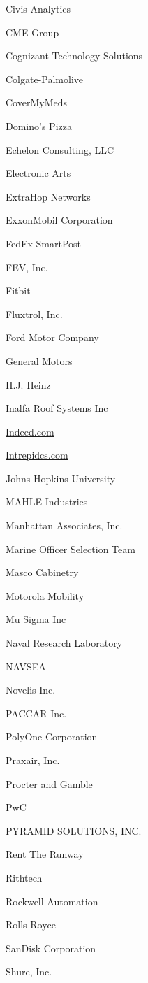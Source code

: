 \documentclass[twoside]{article}
\begin{document}
\begin{center}
\begin{multicols}{5}
\begin{FlushLeft}
\begin{compactitem}
\item Civis Analytics
\item CME Group
\item Cognizant Technology Solutions
\item Colgate-Palmolive
\item CoverMyMeds
\item Domino's Pizza
\item Echelon Consulting, LLC
\item Electronic Arts
\item ExtraHop Networks
\item ExxonMobil Corporation
\item FedEx SmartPost
\item FEV, Inc.
\item Fitbit
\item Fluxtrol, Inc.
\item Ford Motor Company
\item General Motors
\item H.J. Heinz
\item Inalfa Roof Systems Inc
\item \url{Indeed.com}
\item \url{Intrepidcs.com}
\item Johns Hopkins University
\item MAHLE Industries
\item Manhattan Associates, Inc.
\item Marine Officer Selection Team
\item Masco Cabinetry
\item Motorola Mobility
\item Mu Sigma Inc
\item Naval Research Laboratory
\item NAVSEA
\item Novelis Inc.
\item PACCAR Inc.
\item PolyOne Corporation
\item Praxair, Inc.
\item Procter and Gamble
\item PwC
\item PYRAMID SOLUTIONS, INC.
\item Rent The Runway
\item Rithtech
\item Rockwell Automation
\item Rolls-Royce
\item SanDisk Corporation
\item Shure, Inc.

\end{compactitem}
\end{FlushLeft}
\end{multicols}
\end{center}
\end{document}
